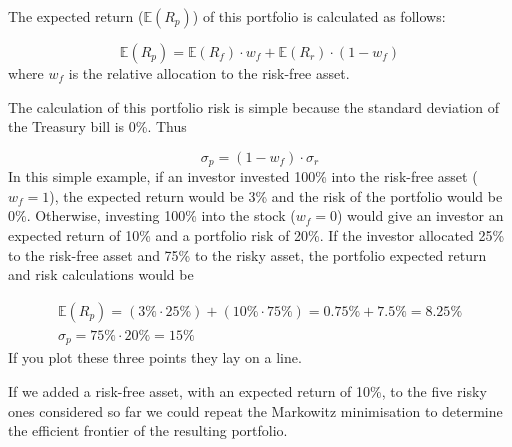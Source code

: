The expected return (\(\mathbb{E}(R_p)\)) of this portfolio is calculated as follows:

\begin{equation*} 
\mathbb{E}(R_p) = \mathbb{E}(R_f)\cdot w_f + \mathbb{E}(R_r)\cdot (1- w_f) 
\end{equation*}
where \(w_f\) is the relative allocation to the risk-free asset.

The calculation of this portfolio risk is simple because the standard deviation of the Treasury bill is 0\%. Thus

\begin{equation*} 
\sigma_p = (1-w_f)\cdot \sigma_r 
\end{equation*}
In this simple example, if an investor invested 100\% into the risk-free asset (\(w_f=1\)), the expected return would be 3\% and the risk of the portfolio would be 0\%. Otherwise, investing 100\% into the stock (\(w_f=0\)) would give an investor an expected return of 10\% and a portfolio risk of 20\%. If the investor allocated 25\% to the risk-free asset and 75\% to the risky asset, the portfolio expected return and risk calculations would be

\begin{equation*}
\begin{gathered}
\mathbb{E}(R_p) = (3\% \cdot 25\%) + (10\% \cdot 75\%) = 0.75\% + 7.5\% = 8.25\% \\
\sigma_p = 75\% \cdot 20\% = 15\% 
\end{gathered}
\end{equation*}
\noindent
If you plot these three points they lay on a line.

If we added a risk-free asset, with an expected return of 10\%, to the five risky ones considered so far we could repeat the Markowitz minimisation to determine the efficient frontier of the resulting portfolio. 

